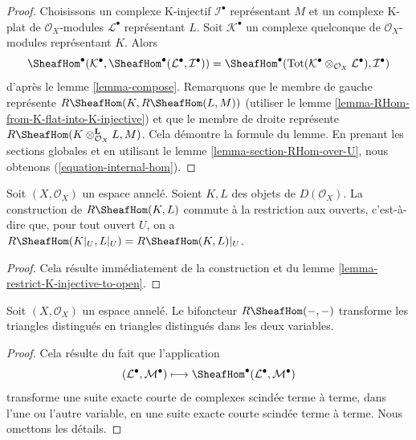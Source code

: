 \begin{proof}

Choisissons un complexe K-injectif $\mathcal{I}^\bullet$ représentant
$M$ et un complexe K-plat de $\mathcal{O}_X$-modules $\mathcal{L}^\bullet$
représentant $L$. Soit $\mathcal{K}^\bullet$ un complexe quelconque de
$\mathcal{O}_X$-modules représentant $K$. Alors
$$
\SheafHom^\bullet(\mathcal{K}^\bullet,
\SheafHom^\bullet(\mathcal{L}^\bullet, \mathcal{I}^\bullet))
=
\SheafHom^\bullet(
\text{Tot}(\mathcal{K}^\bullet \otimes_{\mathcal{O}_X} \mathcal{L}^\bullet),
\mathcal{I}^\bullet)
$$
d'après le lemme \ref{lemma-compose}. Remarquons que le membre de gauche représente
$R\SheafHom(K, R\SheafHom(L, M))$ (utiliser le lemme \ref{lemma-RHom-from-K-flat-into-K-injective}) et que le membre de droite représente
$R\SheafHom(K \otimes_{\mathcal{O}_X}^\mathbf{L} L, M)$. Cela démontre la formule du lemme. En prenant les sections globales et en utilisant le lemme \ref{lemma-section-RHom-over-U},
nous obtenons (\ref{equation-internal-hom}).

\end{proof}

\begin{lemma}

\label{lemma-restriction-RHom-to-U}
Soit $(X, \mathcal{O}_X)$ un espace annelé. Soient $K, L$ des objets de $D(\mathcal{O}_X)$. La construction de $R\SheafHom(K, L)$ commute à la restriction aux ouverts, c'est-à-dire que, pour tout ouvert $U$, on a $R\SheafHom(K|_U, L|_U) = R\SheafHom(K, L)|_U$.
\end{lemma}

\begin{proof}
Cela résulte immédiatement de la construction et du lemme \ref{lemma-restrict-K-injective-to-open}.
\end{proof}

\begin{lemma}

\label{lemma-RHom-triangulated}

Soit $(X, \mathcal{O}_X)$ un espace annelé. Le bifoncteur $R\SheafHom(- , -)$
transforme les triangles distingués en triangles distingués dans les deux variables.

\end{lemma}

\begin{proof}

Cela résulte du fait que l'application
$$
(\mathcal{L}^\bullet, \mathcal{M}^\bullet) \longmapsto
\SheafHom^\bullet(\mathcal{L}^\bullet, \mathcal{M}^\bullet)
$$
transforme une suite exacte courte de complexes scindée terme à terme, dans l'une ou l'autre variable, en une suite exacte courte scindée terme à terme. Nous omettons les détails.

\end{proof}

